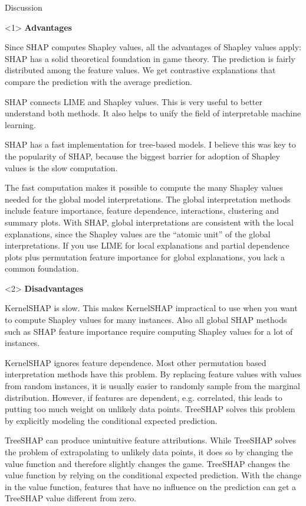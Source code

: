 \documentclass[11pt,compress,t,notes=noshow, aspectratio=169, xcolor=table]{beamer}
\begin{document}
\begin{vbframe}{Discussion}
\begin{onlyenv}<1>
\textbf{Advantages}

Since SHAP computes Shapley values, all the advantages of Shapley values apply: SHAP has a solid theoretical foundation in game theory. The prediction is fairly distributed among the feature values. We get contrastive explanations that compare the prediction with the average prediction.

SHAP connects LIME and Shapley values. This is very useful to better understand both methods. It also helps to unify the field of interpretable machine learning.

SHAP has a fast implementation for tree-based models. I believe this was key to the popularity of SHAP, because the biggest barrier for adoption of Shapley values is the slow computation.

The fast computation makes it possible to compute the many Shapley values needed for the global model interpretations. The global interpretation methods include feature importance, feature dependence, interactions, clustering and summary plots. With SHAP, global interpretations are consistent with the local explanations, since the Shapley values are the “atomic unit” of the global interpretations. If you use LIME for local explanations and partial dependence plots plus permutation feature importance for global explanations, you lack a common foundation.
\end{onlyenv}

\begin{onlyenv}<2>
\textbf{Disadvantages}

KernelSHAP is slow. This makes KernelSHAP impractical to use when you want to compute Shapley values for many instances. Also all global SHAP methods such as SHAP feature importance require computing Shapley values for a lot of instances.

KernelSHAP ignores feature dependence. Most other permutation based interpretation methods have this problem. By replacing feature values with values from random instances, it is usually easier to randomly sample from the marginal distribution. However, if features are dependent, e.g. correlated, this leads to putting too much weight on unlikely data points. TreeSHAP solves this problem by explicitly modeling the conditional expected prediction.

TreeSHAP can produce unintuitive feature attributions. While TreeSHAP solves the problem of extrapolating to unlikely data points, it does so by changing the value function and therefore slightly changes the game. TreeSHAP changes the value function by relying on the conditional expected prediction. With the change in the value function, features that have no influence on the prediction can get a TreeSHAP value different from zero.


\end{onlyenv}
\end{vbframe}
\end{document}
